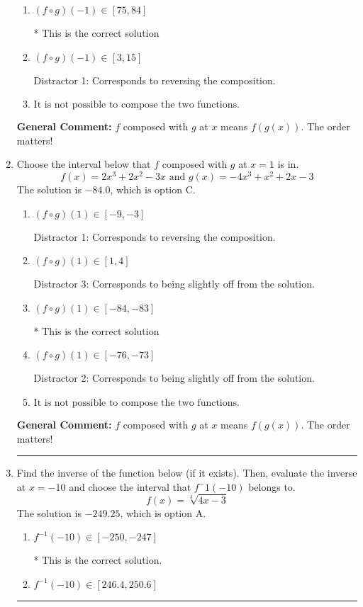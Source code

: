 \documentclass{extbook}[14pt]
\newcommand{\litem}[1]{\item #1

\rule{\textwidth}{0.4pt}}
\begin{document}
\begin{enumerate}
{\begin{enumerate}[label=\Alph*.]
 Distractor 2: Corresponds to being slightly off from the solution.
\item \( (f \circ g)(-1) \in [75, 84] \)

* This is the correct solution
\item \( (f \circ g)(-1) \in [3, 15] \)

 Distractor 1: Corresponds to reversing the composition.
\item \( \text{It is not possible to compose the two functions.} \)


\end{enumerate}

\textbf{General Comment:} $f$ composed with $g$ at $x$ means $f(g(x))$. The order matters!
}
\litem{
Choose the interval below that $f$ composed with $g$ at $x=1$ is in.
\[ f(x) = 2x^{3} +2 x^{2} -3 x \text{ and } g(x) = -4x^{3} + x^{2} +2 x -3 \]The solution is \( -84.0 \), which is option C.\begin{enumerate}[label=\Alph*.]
\item \( (f \circ g)(1) \in [-9, -3] \)

 Distractor 1: Corresponds to reversing the composition.
\item \( (f \circ g)(1) \in [1, 4] \)

 Distractor 3: Corresponds to being slightly off from the solution.
\item \( (f \circ g)(1) \in [-84, -83] \)

* This is the correct solution
\item \( (f \circ g)(1) \in [-76, -73] \)

 Distractor 2: Corresponds to being slightly off from the solution.
\item \( \text{It is not possible to compose the two functions.} \)


\end{enumerate}

\textbf{General Comment:} $f$ composed with $g$ at $x$ means $f(g(x))$. The order matters!
}
\litem{
Find the inverse of the function below (if it exists). Then, evaluate the inverse at $x = -10$ and choose the interval that $f^-1(-10)$ belongs to.
\[ f(x) = \sqrt[3]{4 x - 3} \]The solution is \( -249.25 \), which is option A.\begin{enumerate}[label=\Alph*.]
\item \( f^{-1}(-10) \in [-250, -247] \)

* This is the correct solution.
\item \( f^{-1}(-10) \in [246.4, 250.6] \)


\end{enumerate}}
\end{enumerate}
\end{document}
